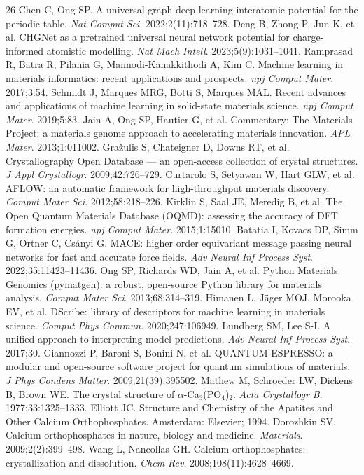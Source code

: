 \documentclass[review,11pt,a4paper]{elsarticle}
\begin{document}
\begin{thebibliography}{26}
 Chen C, Ong SP. A universal graph deep learning interatomic potential for the periodic table. \textit{Nat Comput Sci}. 2022;2(11):718--728.
 Deng B, Zhong P, Jun K, et al. CHGNet as a pretrained universal neural network potential for charge-informed atomistic modelling. \textit{Nat Mach Intell}. 2023;5(9):1031--1041.
 Ramprasad R, Batra R, Pilania G, Mannodi-Kanakkithodi A, Kim C. Machine learning in materials informatics: recent applications and prospects. \textit{npj Comput Mater}. 2017;3:54.
 Schmidt J, Marques MRG, Botti S, Marques MAL. Recent advances and applications of machine learning in solid-state materials science. \textit{npj Comput Mater}. 2019;5:83.
 Jain A, Ong SP, Hautier G, et al. Commentary: The Materials Project: a materials genome approach to accelerating materials innovation. \textit{APL Mater}. 2013;1:011002.
 Gra\v{z}ulis S, Chateigner D, Downs RT, et al. Crystallography Open Database --- an open-access collection of crystal structures. \textit{J Appl Crystallogr}. 2009;42:726--729.
 Curtarolo S, Setyawan W, Hart GLW, et al. AFLOW: an automatic framework for high-throughput materials discovery. \textit{Comput Mater Sci}. 2012;58:218--226.
 Kirklin S, Saal JE, Meredig B, et al. The Open Quantum Materials Database (OQMD): assessing the accuracy of DFT formation energies. \textit{npj Comput Mater}. 2015;1:15010.
 Batatia I, Kovacs DP, Simm G, Ortner C, Cs\'anyi G. MACE: higher order equivariant message passing neural networks for fast and accurate force fields. \textit{Adv Neural Inf Process Syst}. 2022;35:11423--11436.
 Ong SP, Richards WD, Jain A, et al. Python Materials Genomics (pymatgen): a robust, open-source Python library for materials analysis. \textit{Comput Mater Sci}. 2013;68:314--319.
 Himanen L, J\"ager MOJ, Morooka EV, et al. DScribe: library of descriptors for machine learning in materials science. \textit{Comput Phys Commun}. 2020;247:106949.
 Lundberg SM, Lee S-I. A unified approach to interpreting model predictions. \textit{Adv Neural Inf Process Syst}. 2017;30.
 Giannozzi P, Baroni S, Bonini N, et al. QUANTUM ESPRESSO: a modular and open-source software project for quantum simulations of materials. \textit{J Phys Condens Matter}. 2009;21(39):395502.
 Mathew M, Schroeder LW, Dickens B, Brown WE. The crystal structure of $\alpha$-Ca$_3$(PO$_4$)$_2$. \textit{Acta Crystallogr B}. 1977;33:1325--1333.
 Elliott JC. Structure and Chemistry of the Apatites and Other Calcium Orthophosphates. Amsterdam: Elsevier; 1994.
 Dorozhkin SV. Calcium orthophosphates in nature, biology and medicine. \textit{Materials}. 2009;2(2):399--498.
 Wang L, Nancollas GH. Calcium orthophosphates: crystallization and dissolution. \textit{Chem Rev}. 2008;108(11):4628--4669.
\end{thebibliography}
\end{document}

